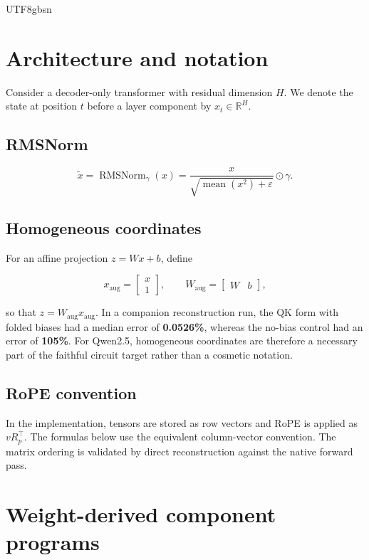 \documentclass[11pt]{article}
\begin{document}
\begin{CJK*}{UTF8}{gbsn}
\section{Architecture and notation}

Consider a decoder-only transformer with residual dimension \(H\). We
denote the state at position \(t\) before a layer component by
\(x_t\in\mathbb{R}^{H}\).

\subsection{RMSNorm}

\[
\widetilde{x} = \operatorname{RMSNorm}_{\gamma}(x) = \frac{x}{\sqrt{\operatorname{mean}(x^2)+\varepsilon}}\odot\gamma.
\]

\subsection{Homogeneous
coordinates}

For an affine projection \(z=Wx+b\), define

\[
x_{\mathrm{aug}}=\begin{bmatrix}x\\1\end{bmatrix},\qquad W_{\mathrm{aug}}=\begin{bmatrix}W & b\end{bmatrix},
\]

so that \(z=W_{\mathrm{aug}}x_{\mathrm{aug}}\). In a companion
reconstruction run, the QK form with folded biases had a median error of
\textbf{0.0526\%}, whereas the no-bias control had an error of
\textbf{105\%}. For Qwen2.5, homogeneous coordinates are therefore a
necessary part of the faithful circuit target rather than a cosmetic
notation.

\subsection{RoPE convention}

In the implementation, tensors are stored as row vectors and RoPE is
applied as \(vR_p^\top\). The formulas below use the equivalent
column-vector convention. The matrix ordering is validated by direct
reconstruction against the native forward pass.

\section{Weight-derived component programs}


\end{CJK*}
\end{document}
